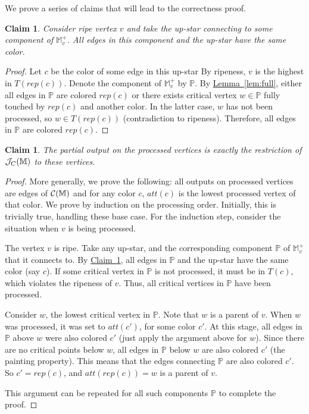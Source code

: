 \documentclass[11pt]{article}
\newtheorem{claim}[theorem]{Claim}
\theoremstyle{definition}
\newcommand{\cC}{{\cal C}}
\newcommand{\cJ}{{\cal J}}
\newcommand{\MM}{\mathbb{M}}
\newcommand{\PP}{\mathbb{P}}
\newcommand{\Clm}[1]{\hyperref[clm:#1]{Claim~\ref*{clm:#1}}} %
\newcommand{\Lem}[1]{\hyperref[lem:#1]{Lemma~\ref*{lem:#1}}} %
\newcommand{\h}{att}
\newcommand{\jc}{\cJ_C}
\newcommand{\rep}{rep}
\begin{document}
We prove a series of claims that will lead to the correctness proof.

\begin{claim} \label{clm:upstar} Consider ripe vertex $v$ and take the up-star connecting
to some component of $\MM^+_v$. All edges in this component and the up-star have the same color.
\end{claim}

\begin{proof} Let $c$ be the color of some edge in this up-star
By ripeness, $v$ is the highest in $T(\rep(c))$.
Denote the component of $\MM^+_v$ by $\PP$.
By \Lem{full}, either all edges in $\PP$ are colored $\rep(c)$ or there exists critical vertex $w \in \PP$
fully touched by $\rep(c)$ and another color. In the latter case, $w$ has not been processed,
so $w \in T(\rep(c))$ (contradiction to ripeness). Therefore, all edges in $\PP$ are colored $\rep(c)$.
\end{proof}


\begin{claim} \label{clm:process} The partial output on the processed vertices is exactly
the restriction of $\jc(\MM)$ to these vertices.
\end{claim}

\begin{proof} More generally, we prove the following: all outputs on processed vertices
are edges of $\cC(\MM)$ and for any color $c$, $\h(c)$ is the lowest processed vertex
of that color. We prove by induction on the processing order. Initially, this is trivially
true, handling these base case. For the induction step, consider the situation
when $v$ is being processed.

The vertex $v$ is ripe. Take any up-star, and the corresponding component $\PP$
of $\MM^+_v$ that it connects to. By \Clm{upstar}, all edges in $\PP$ and the up-star
have the same color (say $c$). If some critical vertex in $\PP$ is not processed,
it must be in $T(c)$, which violates the ripeness of $v$.
Thus, all critical vertices in $\PP$ have been processed.

Consider $w$, the lowest critical vertex in $\PP$. Note that $w$ is a parent of $v$. When $w$ was processed, it was set to $\h(c')$, for
some color $c'$. At this stage, all edges in $\PP$ above $w$ were also colored $c'$ (just apply the argument
above for $w$). Since there are no critical points below $w$, all edges in $\PP$ below $w$
are also colored $c'$ (the painting property). This means that the edges connecting $\PP$
are also colored $c'$. So $c' = \rep(c)$, and $\h(\rep(c)) = w$ is a parent of $v$. 

This argument can be repeated for all such components $\PP$ to complete the proof.
\end{proof}
\end{document}
